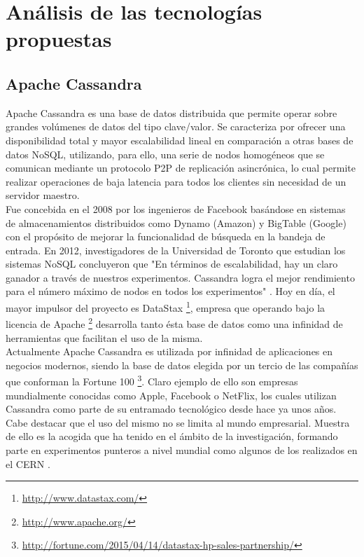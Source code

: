 
\pagestyle{fancy}

\chapter{Análisis de las tecnologías propuestas}
\label{analisis_tecnologias}

\section{Apache Cassandra}

Apache Cassandra es una base de datos distribuida que permite operar sobre grandes volúmenes de datos del tipo clave/valor. Se caracteriza por ofrecer una  disponibilidad total y mayor escalabilidad lineal en comparación a otras bases de datos NoSQL, utilizando, para ello, una serie de nodos homogéneos que se comunican mediante un protocolo P2P de replicación asincrónica, lo cual permite realizar operaciones de baja latencia para todos los clientes sin necesidad de un servidor maestro.\\

Fue concebida en el 2008 por los ingenieros de Facebook basándose en sistemas de almacenamientos distribuidos como Dynamo (Amazon) \cite{decandia2007dynamo} y BigTable (Google) \cite{chang2008bigtable} con el propósito de mejorar la funcionalidad de búsqueda en la bandeja de entrada. En 2012, investigadores de la Universidad de Toronto que estudian los sistemas NoSQL concluyeron que "En términos de escalabilidad, hay un claro ganador a través de nuestros experimentos. Cassandra logra el mejor rendimiento para el número máximo de nodos en todos los experimentos" \cite{rabl2012solving}. Hoy en día, el mayor impulsor del proyecto es DataStax \footnote{\url{http://www.datastax.com/}}, empresa que operando bajo la licencia de Apache \footnote{\url{http://www.apache.org/}} desarrolla tanto ésta base de datos como una infinidad de herramientas que facilitan el uso de la misma.\\

Actualmente Apache Cassandra es utilizada por infinidad de aplicaciones en negocios modernos, siendo la base de datos elegida por un tercio de las compañías que conforman la Fortune 100 \footnote{\url{http://fortune.com/2015/04/14/datastax-hp-sales-partnership/}}. Claro ejemplo de ello son empresas mundialmente conocidas como Apple, Facebook o NetFlix, los cuales utilizan Cassandra como parte de su entramado tecnológico desde hace ya unos años. Cabe destacar que el uso del mismo no se limita al mundo empresarial. Muestra de ello es la acogida que ha tenido en el ámbito de la investigación, formando parte en experimentos punteros a nivel mundial como algunos de los realizados en el CERN \cite{sicoe2012persistent}.\\

